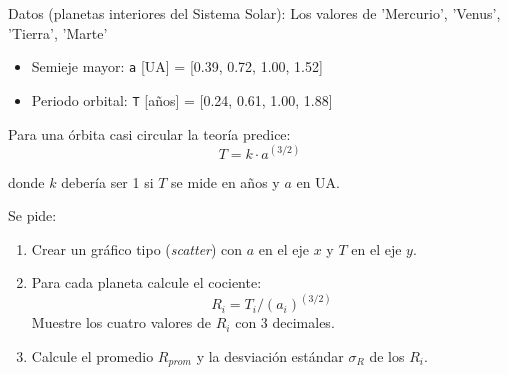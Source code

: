 \documentclass[10pt]{article}
\begin{document}

\begin{tcolorbox}[title={Pregunta 3 – Verificación directa de la ley de Kepler}]
Datos (planetas interiores del Sistema Solar): Los valores de 'Mercurio', 'Venus', 'Tierra', 'Marte'

\begin{itemize}
    \item Semieje mayor: \texttt{a} [UA]      = [0.39, 0.72, 1.00, 1.52]
    \item Periodo orbital: \texttt{T} [años]  = [0.24, 0.61, 1.00, 1.88]
\end{itemize}

Para una órbita casi circular la teoría predice:
\[
      T = k \cdot a^{(3/2)}
\]

donde $k$ debería ser 1 si $T$ se mide en años y $a$ en UA.

   Se pide:
\begin{enumerate}
    \item Crear un gráfico tipo (\textit{scatter}) con $a$ en el eje $x$ y $T$ en el eje $y$.
    
    \item Para cada planeta calcule el cociente:
    \[
    R_i = T_i / (a_i)^{(3/2)}
    \]
    Muestre los cuatro valores de $R_i$ con 3 decimales.

    \item Calcule el promedio $R_{prom}$ y la desviación estándar $\sigma_R$ de los $R_i$.
\end{enumerate}
\end{tcolorbox}
\end{document}

